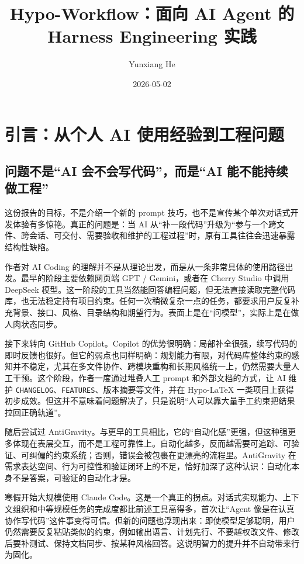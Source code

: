 \documentclass[
  outputdir=build,
  chapterstyle=cn,
  colorscheme=Simple,
  fontset=tech,
  code=false
]{Hypo-Note}
\title{Hypo-Workflow：面向 AI Agent 的 Harness Engineering 实践}
\author{Yunxiang He}
\date{2026-05-02}
\begin{document}
\makecover
\frontmatter
\tableofcontents
\mainmatter


\chapter{引言：从个人 AI 使用经验到工程问题}

\section{问题不是“AI 会不会写代码”，而是“AI 能不能持续做工程”}

这份报告的目标，不是介绍一个新的 prompt 技巧，也不是宣传某个单次对话式开发体验有多惊艳。真正的问题是：当 AI 从“补一段代码”升级为“参与一个跨文件、跨会话、可交付、需要验收和维护的工程过程”时，原有工具往往会迅速暴露结构性缺陷。

作者对 AI Coding 的理解并不是从理论出发，而是从一条非常具体的使用路径出发。最早的阶段主要依赖网页端 GPT / Gemini，或者在 Cherry Studio 中调用 DeepSeek 模型。这一阶段的工具当然能回答编程问题，但无法直接读取完整代码库，也无法稳定持有项目约束。任何一次稍微复杂一点的任务，都要求用户反复补充背景、接口、风格、目录结构和期望行为。表面上是在“问模型”，实际上是在做人肉状态同步。

接下来转向 GitHub Copilot。Copilot 的优势很明确：局部补全很强，续写代码的即时反馈也很好。但它的弱点也同样明确：规划能力有限，对代码库整体约束的感知并不稳定，尤其在多文件协作、跨模块重构和长期风格统一上，仍然需要大量人工干预。这个阶段，作者一度通过堆叠人工 prompt 和外部文档的方式，让 AI 维护 \texttt{CHANGELOG}、\texttt{FEATURES}、版本摘要等文件，并在 Hypo-LaTeX 一类项目上获得初步成效。但这并不意味着问题解决了，只是说明“人可以靠大量手工约束把结果拉回正确轨道”。

随后尝试过 AntiGravity。与更早的工具相比，它的“自动化感”更强，但这种强更多体现在表层交互，而不是工程可靠性上。自动化越多，反而越需要可追踪、可验证、可纠偏的约束系统；否则，错误会被包裹在更漂亮的流程里。AntiGravity 在需求表达空间、行为可控性和验证闭环上的不足，恰好加深了这种认识：自动化本身不是答案，可验证的自动化才是。

寒假开始大规模使用 Claude Code。这是一个真正的拐点。对话式实现能力、上下文组织和中等规模任务的完成度都比前述工具高得多，首次让“Agent 像是在认真协作写代码”这件事变得可信。但新的问题也浮现出来：即使模型足够聪明，用户仍然需要反复粘贴类似的约束，例如输出语言、计划先行、不要越权改文件、修改后要补测试、保持文档同步、按某种风格回答。这说明智力的提升并不自动带来行为固化。
\end{document}

